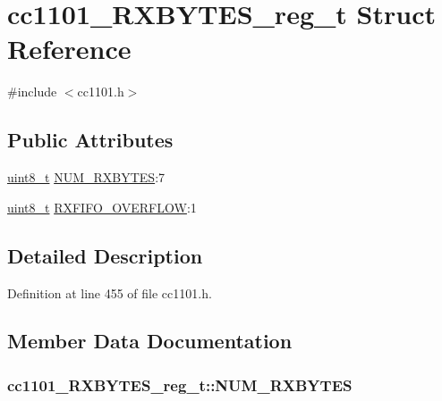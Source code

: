 \hypertarget{structcc1101___r_x_b_y_t_e_s__reg__t}{}\section{cc1101\+\_\+\+R\+X\+B\+Y\+T\+E\+S\+\_\+reg\+\_\+t Struct Reference}
\label{structcc1101___r_x_b_y_t_e_s__reg__t}


{\ttfamily \#include $<$cc1101.\+h$>$}

\subsection*{Public Attributes}
\begin{DoxyCompactItemize}
\item 
\hyperlink{_p_e___types_8h_aba7bc1797add20fe3efdf37ced1182c5}{uint8\+\_\+t} \hyperlink{structcc1101___r_x_b_y_t_e_s__reg__t_aeaeeb1b6fdb038f0a6e4349b7a9a4a69}{N\+U\+M\+\_\+\+R\+X\+B\+Y\+T\+ES}\+:7
\item 
\hyperlink{_p_e___types_8h_aba7bc1797add20fe3efdf37ced1182c5}{uint8\+\_\+t} \hyperlink{structcc1101___r_x_b_y_t_e_s__reg__t_a080a27024abd26eae3f6e0dc8ae0da1c}{R\+X\+F\+I\+F\+O\+\_\+\+O\+V\+E\+R\+F\+L\+OW}\+:1
\end{DoxyCompactItemize}


\subsection{Detailed Description}


Definition at line 455 of file cc1101.\+h.



\subsection{Member Data Documentation}
\subsubsection[{\texorpdfstring{N\+U\+M\+\_\+\+R\+X\+B\+Y\+T\+ES}{NUM_RXBYTES}}]{ cc1101\+\_\+\+R\+X\+B\+Y\+T\+E\+S\+\_\+reg\+\_\+t\+::\+N\+U\+M\+\_\+\+R\+X\+B\+Y\+T\+ES}\hypertarget{structcc1101___r_x_b_y_t_e_s__reg__t_aeaeeb1b6fdb038f0a6e4349b7a9a4a69}{}\label{structcc1101___r_x_b_y_t_e_s__reg__t_aeaeeb1b6fdb038f0a6e4349b7a9a4a69}


